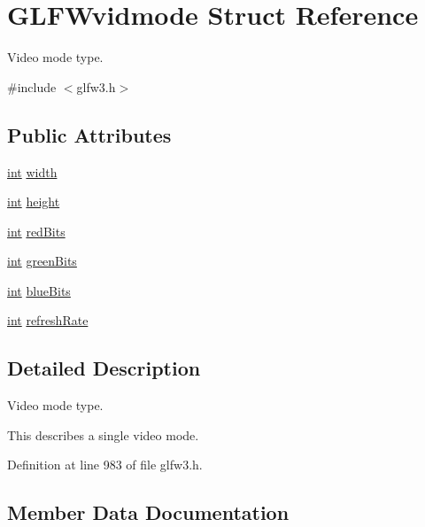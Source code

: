 \hypertarget{struct_g_l_f_wvidmode}{}\section{G\+L\+F\+Wvidmode Struct Reference}
\label{struct_g_l_f_wvidmode}


Video mode type.  




{\ttfamily \#include $<$glfw3.\+h$>$}

\subsection*{Public Attributes}
\begin{DoxyCompactItemize}
\item 
\hyperlink{wglew_8h_a500a82aecba06f4550f6849b8099ca21}{int} \hyperlink{struct_g_l_f_wvidmode_a698dcb200562051a7249cb6ae154c71d}{width}
\item 
\hyperlink{wglew_8h_a500a82aecba06f4550f6849b8099ca21}{int} \hyperlink{struct_g_l_f_wvidmode_ac65942a5f6981695517437a9d571d03c}{height}
\item 
\hyperlink{wglew_8h_a500a82aecba06f4550f6849b8099ca21}{int} \hyperlink{struct_g_l_f_wvidmode_a6066c4ecd251098700062d3b735dba1b}{red\+Bits}
\item 
\hyperlink{wglew_8h_a500a82aecba06f4550f6849b8099ca21}{int} \hyperlink{struct_g_l_f_wvidmode_a292fdd281f3485fb3ff102a5bda43faa}{green\+Bits}
\item 
\hyperlink{wglew_8h_a500a82aecba06f4550f6849b8099ca21}{int} \hyperlink{struct_g_l_f_wvidmode_af310977f58d2e3b188175b6e3d314047}{blue\+Bits}
\item 
\hyperlink{wglew_8h_a500a82aecba06f4550f6849b8099ca21}{int} \hyperlink{struct_g_l_f_wvidmode_a791bdd6c7697b09f7e9c97054bf05649}{refresh\+Rate}
\end{DoxyCompactItemize}


\subsection{Detailed Description}
Video mode type. 

This describes a single video mode. 

Definition at line 983 of file glfw3.\+h.



\subsection{Member Data Documentation}
\hypertarget{struct_g_l_f_wvidmode_af310977f58d2e3b188175b6e3d314047}{}
